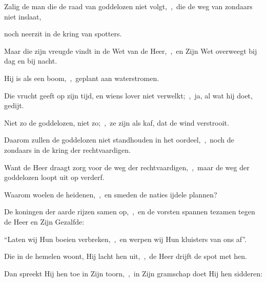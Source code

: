 \documentclass[12pt,twoside,a5paper]{article}
\begin{document}






\begin{halfparskip}
   Zalig de man die de raad van goddelozen niet volgt,~\sep\ die de weg van zondaars niet inslaat,


  noch neerzit in de kring van spotters.

  Maar die zijn vreugde vindt in de Wet van de Heer,~\sep\ en Zijn Wet overweegt bij dag en bij nacht.

  Hij is als een boom,~\sep\ geplant aan waterstromen.

  Die vrucht geeft op zijn tijd, en wiens lover niet verwelkt;~\sep\ ja, al wat hij doet, gedijt.

  Niet zo de goddelozen, niet zo;~\sep\ ze zijn als kaf, dat de wind verstrooit.

  Daarom zullen de goddelozen niet standhouden in het oordeel,~\sep\ noch de zondaars in de kring der
  rechtvaardigen.

  Want de Heer draagt zorg voor de weg der rechtvaardigen,~\sep\ maar de weg der goddelozen loopt uit op verderf.

   Waarom woelen de heidenen,~\sep\ en smeden de naties ijdele plannen?

  De koningen der aarde rijzen samen op,~\sep\ en de vorsten spannen tezamen tegen de Heer en Zijn Gezalfde:

  ``Laten wij Hun boeien verbreken,~\sep\ en werpen wij Hun kluisters van ons af''.

  Die in de hemelen woont, Hij lacht hen uit,~\sep\ de Heer drijft de spot met hen.

  Dan spreekt Hij hen toe in Zijn toorn,~\sep\ in Zijn gramschap doet Hij hen sidderen:


\end{halfparskip}
\end{document}
